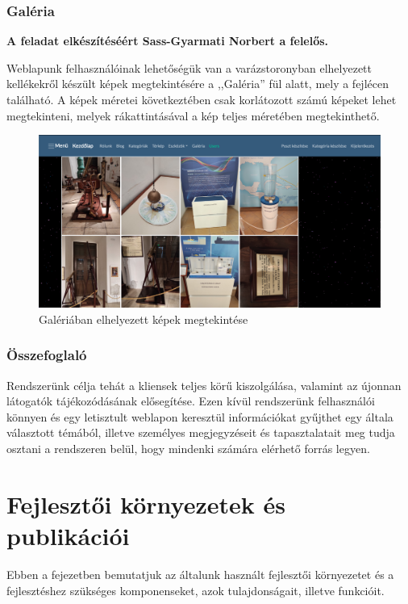 \documentclass[
]{thesis-ekf}
\theoremstyle{definition}
\theoremstyle{remark}
\begin{document}
		\subsection{Galéria}
			\textbf{A feladat elkészítéséért Sass-Gyarmati Norbert a felelős.} 
			\par Weblapunk felhasználóinak lehetőségük van a varázstoronyban elhelyezett kellékekről készült képek megtekintésére a ,,Galéria'' fül alatt, mely a fejlécen található. A képek méretei következtében csak korlátozott számú képeket lehet megtekinteni, melyek rákattintásával a kép teljes méretében megtekinthető. 
			\begin{figure}[ht]
				\centering
				\includegraphics[scale=0.30]{./images/gallery}
				\caption{Galériában elhelyezett képek megtekintése}
				\label{fig:contactme}
			\end{figure}
		\subsection{Összefoglaló}
			\par Rendszerünk célja tehát a kliensek teljes körű kiszolgálása, valamint az újonnan látogatók tájékozódásának elősegítése. Ezen kívül rendszerünk felhasználói könnyen és egy letisztult weblapon keresztül információkat gyűjthet egy általa választott témából, illetve személyes megjegyzéseit és  tapasztalatait meg tudja osztani a rendszeren belül, hogy mindenki számára elérhető forrás legyen.

\chapter{Fejlesztői környezetek és publikációi}
	\par Ebben a fejezetben bemutatjuk az általunk használt fejlesztői környezetet és a fejlesztéshez szükséges komponenseket, azok tulajdonságait, illetve funkcióit.
\end{document}

